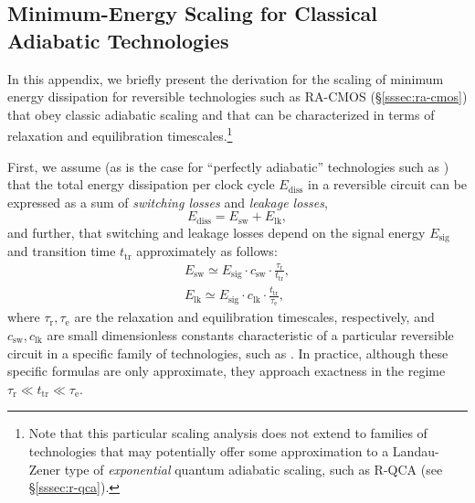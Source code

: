 \documentclass[preprints,article,accept,moreauthors,pdftex]{Definitions/mdpi}
\begin{document}
\begin{paracol}{2}
\appendixstart
\appendix
\section{Minimum-Energy Scaling for Classical Adiabatic Technologies}
\label{app:adia-minE}

In this appendix, we briefly present the derivation for the scaling of minimum energy dissipation for reversible technologies such as RA-CMOS (\S\ref{sssec:ra-cmos}) that obey classic adiabatic scaling and that can be characterized in terms of relaxation and equilibration timescales.\footnote{Note that this particular scaling analysis does not extend to families of technologies that may potentially offer some approximation to a Landau-Zener type of \textit{exponential} quantum adiabatic scaling, such as R-QCA (see \S\ref{sssec:r-qca}).}

First, we assume (as is the case for ``perfectly adiabatic'' technologies such as \cite{Fra+20b}) that the total energy dissipation per clock cycle $E_\mathrm{diss}$ in a reversible circuit can be expressed as a sum of \textit{switching losses} and \textit{leakage losses},
\begin{equation}\label{eq:Ediss}
    E_\mathrm{diss} = E_\mathrm{sw} + E_\mathrm{lk},
\end{equation}
and further, that switching and leakage losses depend on the signal energy $E_\mathrm{sig}$ and transition time $t_\mathrm{tr}$ approximately as follows:
\begin{gather}
    E_\mathrm{sw} \simeq E_\mathrm{sig}\cdot c_\mathrm{sw}\cdot\frac{\tau_\mathrm{r}}{t_\mathrm{tr}},\label{eq:Esw}\\
    E_\mathrm{lk} \simeq E_\mathrm{sig}\cdot c_\mathrm{lk}\cdot\frac{t_\mathrm{tr}}{\tau_\mathrm{e}},\label{eq:Elk}
\end{gather}
where $\tau_\mathrm{r},\tau_\mathrm{e}$ are the relaxation and equilibration timescales, respectively, and $c_\mathrm{sw},c_\mathrm{lk}$ are small dimensionless constants characteristic of a particular reversible circuit in a specific family of technologies, such as \cite{Fra+20b}. In practice, although these specific formulas are only approximate, they approach exactness in the regime $\tau_\mathrm{r} \ll t_\mathrm{tr} \ll \tau_\mathrm{e}$.


\end{paracol}
\end{document}
